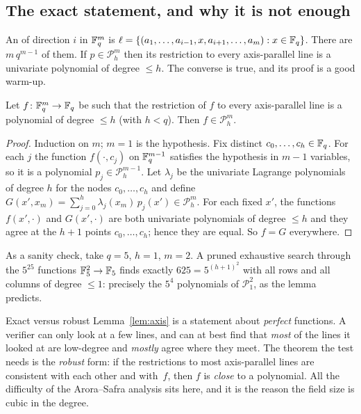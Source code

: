 \subsection{The exact statement, and why it is not enough}

An  of direction $i$ in $\mathbb{F}_q^m$ is $\ell=\{(a_1,\dots,a_{i-1},x,a_{i+1},\dots,a_m):x\in\mathbb{F}_q\}$.  There are $m\,q^{m-1}$ of them.
If $p\in\mathcal P^m_h$ then its restriction to every axis-parallel line is a univariate polynomial of degree $\le h$.  The converse is true, and its proof is a good warm-up.

\begin{lemma}\label{lem:axis}
Let $f\colon\mathbb{F}_q^m\to\mathbb{F}_q$ be such that the restriction of $f$ to every axis-parallel line is a polynomial of degree $\le h$ (with $h<q$).  Then $f\in\mathcal P^m_h$.
\end{lemma}
\begin{proof}
Induction on $m$; $m=1$ is the hypothesis.  Fix distinct $c_0,\dots,c_h\in\mathbb{F}_q$.  For each $j$ the function $f(\cdot,c_j)$ on $\mathbb{F}_q^{m-1}$ satisfies the hypothesis in $m-1$ variables, so it is a polynomial
$p_j\in\mathcal P^{m-1}_h$.  Let $\lambda_j$ be the univariate Lagrange polynomials of degree $h$ for the nodes $c_0,\dots,c_h$ and define
$G(x',x_m)=\sum_{j=0}^h\lambda_j(x_m)\,p_j(x')\in\mathcal P^m_h$.  For each fixed $x'$, the functions $f(x',\cdot)$ and $G(x',\cdot)$ are both univariate polynomials of degree $\le h$ and they agree at the
$h+1$ points $c_0,\dots,c_h$; hence they are equal.  So $f=G$ everywhere.
\end{proof}

\noindent
As a sanity check, take $q=5$, $h=1$, $m=2$.  A pruned exhaustive search through the $5^{25}$ functions $\mathbb{F}_5^2\to\mathbb{F}_5$ finds exactly $625=5^{(h+1)^2}$ with all rows and all columns of degree $\le1$:
precisely the $5^4$ polynomials of $\mathcal P^2_1$, as the lemma predicts.

\begin{bigpicture}{Exact versus robust}
Lemma~\ref{lem:axis} is a statement about \emph{perfect} functions.  A verifier can only look at a few lines, and can at best find that \emph{most} of the lines it looked at are low-degree and \emph{mostly} agree where they meet.
The theorem the test needs is the \emph{robust} form: if the restrictions to most axis-parallel lines are consistent with each other and with~$f$, then $f$ is \emph{close} to a polynomial.
All the difficulty of the Arora--Safra analysis sits here, and it is the reason the field size is cubic in the degree.
\end{bigpicture}

